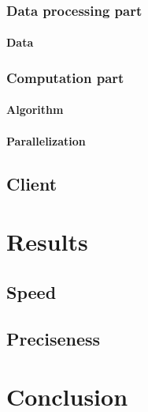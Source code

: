 \documentclass[thesis=M,english]{FITthesis}[2012/10/20]
\begin{document}
\subsection{Data processing part}

\subsubsection{Data}


\subsection{Computation part}

\subsubsection{Algorithm}

\subsubsection{Parallelization}

\section{Client}


\chapter{Results}
\label{ch:Results}

\section{Speed}

\section{Preciseness}

\chapter{Conclusion}




\appendix
\end{document}
